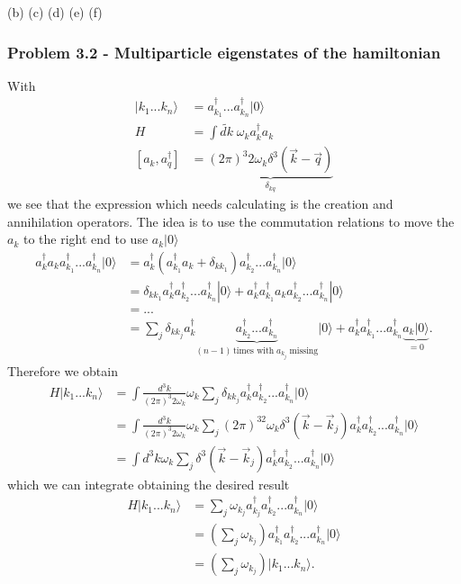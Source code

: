 \documentclass[10pt,a4paper]{article}
\theoremstyle{definition}
\begin{document}
(b)
(c)
(d)
(e)
(f)

\subsubsection{Problem 3.2 - Multiparticle eigenstates of the hamiltonian}
With
\begin{align}
|k_1...k_n\rangle&=a^\dagger_{k_1}...a^\dagger_{k_n}|0\rangle\\
H&=\int\widetilde{dk}\;\omega_k a^\dagger_ka_k\\
[a_k,a_q^\dagger]&=\underbrace{(2\pi)^3 2\omega_k\delta^3(\vec{k}-\vec{q})}_{\delta_{kq}}
\end{align}
we see that the expression which needs calculating is the creation and annihilation operators. The idea is to use the commutation relations to move the $a_k$ to the right end to use $a_k|0\rangle$
\begin{align}
a^\dagger_ka_ka^\dagger_{k_1}...a^\dagger_{k_n}|0\rangle
&=a^\dagger_k(a^\dagger_{k_1}a_k+\delta_{kk_1})a^\dagger_{k_2}...a^\dagger_{k_n}|0\rangle\\
&=\delta_{kk_1}a^\dagger_ka^\dagger_{k_2}...a^\dagger_{k_n}|0\rangle
+a^\dagger_ka^\dagger_{k_1}a_ka^\dagger_{k_2}...a^\dagger_{k_n}|0\rangle\\
&=...\\
&=\sum_j\delta_{kk_j}a^\dagger_k\underbrace{a^\dagger_{k_2}...a^\dagger_{k_n}}_{(n-1)\, \text{times with}\;a_{k_j}\;\text{missing}}|0\rangle+a^\dagger_ka^\dagger_{k_1}...a^\dagger_{k_n}\underbrace{a_k|0\rangle}_{=0}.
\end{align}
Therefore we obtain
\begin{align}
H|k_1...k_n\rangle
&=\int\frac{d^3k}{(2\pi)^3 2\omega_k}\omega_k\sum_j\delta_{kk_j}a^\dagger_ka^\dagger_{k_2}...a^\dagger_{k_n}|0\rangle\\
&=\int\frac{d^3k}{(2\pi)^3 2\omega_k}\omega_k\sum_j(2\pi)^32\omega_k\delta^3(\vec{k}-\vec{k}_j)a^\dagger_ka^\dagger_{k_2}...a^\dagger_{k_n}|0\rangle\\
&=\int d^3k\omega_k\sum_j\delta^3(\vec{k}-\vec{k}_j)a^\dagger_ka^\dagger_{k_2}...a^\dagger_{k_n}|0\rangle
\end{align}
which we can integrate obtaining the desired result
\begin{align}
H|k_1...k_n\rangle
&=\sum_j\omega_{k_j}a^\dagger_{k_j}a^\dagger_{k_2}...a^\dagger_{k_n}|0\rangle\\
&=\left(\sum_j\omega_{k_j}\right)a^\dagger_{k_1}a^\dagger_{k_2}...a^\dagger_{k_n}|0\rangle\\
&=\left(\sum_j\omega_{k_j}\right)|k_1...k_n\rangle.
\end{align}
\end{document}
